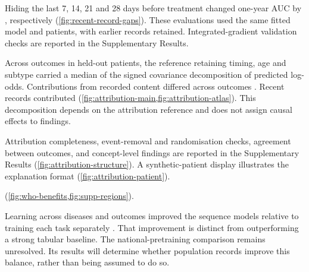 \FloatBarrier
{}
Hiding the last 7, 14, 21 and 28 days before treatment changed one-year
AUC by , respectively
(\cref{fig:recent-record-gaps}).  These evaluations used the same fitted model and
patients, with earlier records retained. Integrated-gradient validation checks
are reported in the Supplementary Results.

Across  outcomes in
 held-out patients, the reference retaining timing,
age and subtype carried a median  of the signed
covariance decomposition of predicted log-odds. Contributions from recorded
content differed across outcomes . Recent records contributed 
(\cref{fig:attribution-main,fig:attribution-atlas}). This decomposition depends
on the attribution reference and does not assign causal effects to findings.

Attribution completeness, event-removal and randomisation checks, agreement
between outcomes, and concept-level findings are reported in the Supplementary
Results (\cref{fig:attribution-structure}). A synthetic-patient display
illustrates the explanation format (\cref{fig:attribution-patient}).



\FloatBarrier
{}
  (\cref{fig:who-benefits,fig:supp-regions}). 

\FloatBarrier
{}
Learning across diseases and outcomes improved the sequence models relative
to training each task separately . That improvement is distinct from outperforming
a strong tabular baseline.   The national-pretraining
comparison remains unresolved. Its results will determine whether population
records improve this balance, rather than being assumed to do so.

